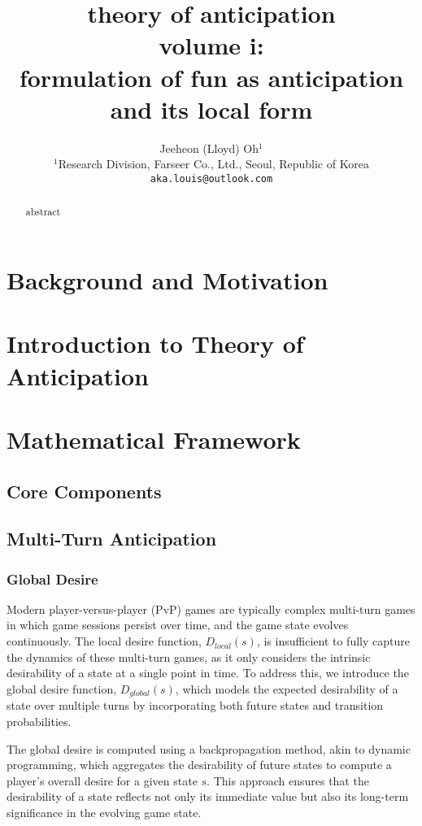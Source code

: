 \documentclass{article}
\title{\textbf{theory of anticipation}\\[3mm] 
       \large volume i:\\[2mm]
       formulation of fun as anticipation and its local form}
\author{Jeeheon (Lloyd) Oh$^{1}$\\
\small{$^{1}$Research Division, Farseer Co., Ltd., Seoul, Republic of Korea}\\
\small{\texttt{aka.louis@outlook.com}}
}
\begin{document}
\maketitle

\begin{abstract}
abstract
\end{abstract}


\section{Background and Motivation}

\section{Introduction to Theory of Anticipation}

\section{Mathematical Framework}

\subsection{Core Components}
\subsection{Multi-Turn Anticipation}

\subsubsection{Global Desire}
Modern player-versus-player (PvP) games are typically complex multi-turn games in which game sessions persist over time, and the game state evolves continuously. The local desire function, \( D_{local}(s) \), is insufficient to fully capture the dynamics of these multi-turn games, as it only considers the intrinsic desirability of a state at a single point in time. To address this, we introduce the global desire function, \( D_{global}(s) \), which models the expected desirability of a state over multiple turns by incorporating both future states and transition probabilities.

The global desire is computed using a backpropagation method, akin to dynamic programming, which aggregates the desirability of future states to compute a player's overall desire for a given state \( s \). This approach ensures that the desirability of a state reflects not only its immediate value but also its long-term significance in the evolving game state.
\end{document}
